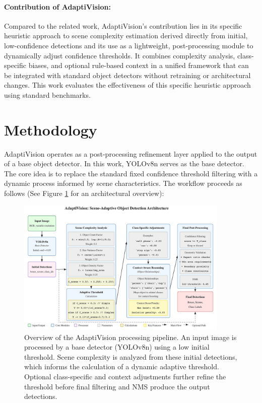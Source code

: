 \documentclass{article}
\begin{document}
\paragraph{Contribution of AdaptiVision:} Compared to the related work, AdaptiVision's contribution lies in its specific heuristic approach to scene complexity estimation derived directly from initial, low-confidence detections and its use as a lightweight, post-processing module to dynamically adjust confidence thresholds. It combines complexity analysis, class-specific biases, and optional rule-based context in a unified framework that can be integrated with standard object detectors without retraining or architectural changes. This work evaluates the effectiveness of this specific heuristic approach using standard benchmarks.

\section{Methodology} \label{sec:methodology}

AdaptiVision operates as a post-processing refinement layer applied to the output of a base object detector. In this work, YOLOv8n \cite{YOLOv8} serves as the base detector. The core idea is to replace the standard fixed confidence threshold filtering with a dynamic process informed by scene characteristics. The workflow proceeds as follows (See Figure \ref{fig:architecture} for an architectural overview):

\begin{figure}[ht]
    \centering
    \includegraphics[width=0.9\textwidth]{figures/architecture.png} 
    \caption{Overview of the AdaptiVision processing pipeline. An input image is processed by a base detector (YOLOv8n) using a low initial threshold. Scene complexity is analyzed from these initial detections, which informs the calculation of a dynamic adaptive threshold. Optional class-specific and context adjustments further refine the threshold before final filtering and NMS produce the output detections.}
    \label{fig:architecture}
\end{figure}
\end{document}
